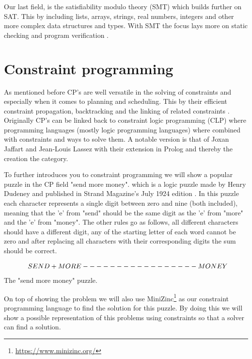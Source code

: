Our last field, is the satisfiability modulo theory (SMT) which builds further on SAT. This by including lists, arrays, strings, real numbers, integers and other more complex data structures and types. With SMT the focus lays more on static checking and program verification \cite{56bardin2019bringing, 54moura2008z3}.


\section{Constraint programming}
\label{CS:CP}
As mentioned before CP's are well versatile in the solving of constraints and especially when it comes to planning and scheduling. This by their efficient constraint propagation, backtracking and the linking of related constraints \cite{66WikiCP}. Originally CP's can be linked back to constraint logic programming (CLP) where programming languages (mostly logic programming languages) where combined with constraints and ways to solve them. A notable version is that of Joxan Jaffart and Jean-Louis Lassez \cite{65jaffar1987constraint, 66WikiCP} with their extension in Prolog and thereby the creation the category.

To further introduces you to constraint programming we will show a popular puzzle in the CP field "send more money". which is a logic puzzle made by Henry Dudeney and published in Strand Magazine's July 1924 edition \cite{sendMoreMoney}.
In this puzzle each character represents a single digit between zero and nine (both included), meaning that the 'e' from "send" should be the same digit as the 'e' from "more" and the 'e' from "money". The other rules go as follows, all different characters should have a different digit, any of the starting letter of each word cannot be zero and after replacing all characters with their corresponding digits the sum should be correct. 
\begin{center}
	\[$$
	\; \; S E N D\\
	+ M O R E\\
	-----------------\\
	M O N E Y
	$$\] The "send more money" puzzle.
\end{center}

On top of showing the problem we will also use MiniZinc\footnote{\url{https://www.minizinc.org/}} as our constraint programming language to find the solution for this puzzle. By doing this we will show a possible representation of this problems using constraints so that a solver can find a solution.

